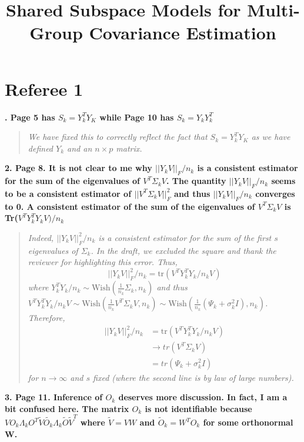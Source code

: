 \documentclass{article}
\title{Shared Subspace Models for Multi-Group Covariance Estimation}
\newcommand{\tr}{\text{tr}}
\newenvironment{resp}{\begin{quotation}\noindent\slshape}{\end{quotation}}
\begin{document}
\section*{Referee 1}

\textbf{. Page 5 has $S_k = Y_k^TY_K$ while Page 10 has $S_k = Y_kY_k^T$}

\begin{resp}
We have fixed this to correctly reflect the fact that $S_k = Y_k^TY_K$ as we have defined $Y_k$ and an $n \times p$ matrix.
\end{resp}

\noindent   \textbf{2. Page 8. It is not clear to me why $||Y_kV||_F/n_k$ is a consistent estimator for the sum
of the eigenvalues of $V^T\Sigma_kV$. The quantity  $||Y_kV||_F/n_k$  seems to be a consistent estimator of $||V^T\Sigma_kV||^2_F$ and thus $||Y_kV||_F/n_k$ converges to 0. A consistent estimator of the sum of the eigenvalues of $V^T\Sigma_kV$ is Tr($V^TY_k^TY_kV)/n_k$}

\begin{resp}
Indeed, $||Y_kV||^2_F/n_k$ is a consistent estimator for the sum of the first $s$ eigenvalues of $\Sigma_k$.  In the draft, we excluded the square and thank the reviewer for highlighting this error.  Thus, $$||Y_kV||_F^2/n_k = \tr (V^TY_k^TY_k/n_kV)$$
where $Y_k^TY_k/n_k \sim \text{Wish}(\frac{1}{n_k}\Sigma_k, n_k)$ and thus $V^TY_k^TY_k/n_kV \sim \text{Wish}(\frac{1}{n_k}V^T\Sigma_kV, n_k) \sim \text{Wish}(\frac{1}{n_k}(\Psi_k + \sigma_k^2I), n_k) $.  
Therefore, 
\begin{align*}
||Y_kV||_F^2/n_k &= \tr (V^TY_k^TY_k/n_kV)\\
&\to tr(V^T\Sigma_kV)\\
& = tr(\Psi_k + \sigma_k^2I)
\end{align*}
for $n \to \infty$ and $s$ fixed (where the second line is by law of large numbers).
\end{resp}

\noindent \textbf{3. Page 11. Inference of $O_k$ deserves more discussion. In fact, I am a bit confused here. The matrix $O_k$ is not identifiable because $VO_k\Lambda_kO^T \tilde{V}\tilde{O_k}Λ_k\tilde{O}\tilde{V}^T$ where $\tilde{V} = VW$ and $\tilde{O}_k = W^TO_k$ for some orthonormal W.}
\end{document}

